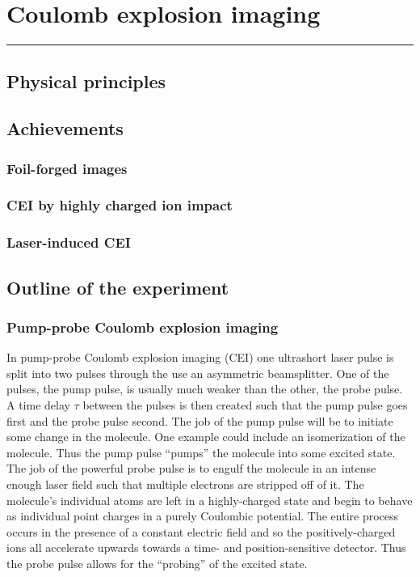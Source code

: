 \chapter{Coulomb explosion imaging}\label{ch:CEI}

\vspace{-1.5 em}
\minitoc\hrule
\vspace{1.5 em}

\section{Physical principles}

\section{Achievements}
\subsection{Foil-forged images}
\subsection{CEI by highly charged ion impact}
\subsection{Laser-induced CEI}

\section{Outline of the experiment}

\subsection{Pump-probe Coulomb explosion imaging}
In pump-probe Coulomb explosion imaging (CEI) one ultrashort laser pulse is split into two pulses through the use an asymmetric beamsplitter. One of the pulses, the pump pulse, is usually much weaker than the other, the probe pulse. A time delay $\tau$ between the pulses is then created such that the pump pulse goes first and the probe pulse second. The job of the pump pulse will be to initiate some change in the molecule. One example could include an isomerization of the molecule. Thus the pump pulse ``pumps'' the molecule into some excited state. The job of the powerful probe pulse is to engulf the molecule in an intense enough laser field such that multiple electrons are stripped off of it. The molecule's individual atoms are left in a highly-charged state and begin to behave as individual point charges in a purely Coulombic potential. The entire process occurs in the presence of a constant electric field and so the positively-charged ions all accelerate upwards towards a time- and position-sensitive detector. Thus the probe pulse allows for the ``probing'' of the excited state.


